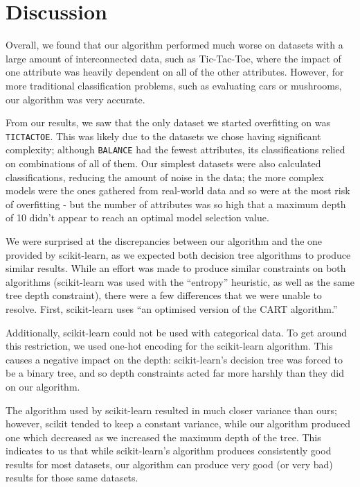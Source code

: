 \documentclass[screen, authorversion, nonacm, sigconf]{acmart}
\begin{document}
\section{Discussion}

Overall, we found that our algorithm performed much worse on datasets with a large amount of interconnected data, such as Tic-Tac-Toe, where the impact of one attribute was heavily dependent on all of the other attributes. However, for more traditional classification problems, such as evaluating cars or mushrooms, our algorithm was very accurate.

From our results, we saw that the only dataset we started overfitting on was \texttt{TICTACTOE}. This was likely due to the datasets we chose having significant complexity; although \texttt{BALANCE} had the fewest attributes, its classifications relied on combinations of all of them. Our simplest datasets were also calculated classifications, reducing the amount of noise in the data; the more complex models were the ones gathered from real-world data and so were at the most risk of overfitting - but the number of attributes was so high that a maximum depth of 10 didn't appear to reach an optimal model selection value.

We were surprised at the discrepancies between our algorithm and the one provided by scikit-learn, as we expected both decision tree algorithms to produce similar results. While an effort was made to produce similar constraints on both algorithms (scikit-learn was used with the ``entropy'' heuristic, as well as the same tree depth constraint), there were a few differences that we were unable to resolve. First, scikit-learn uses ``an optimised version of the CART \cite{DBLP:books/wa/BreimanFOS84} algorithm.''

Additionally, scikit-learn could not be used with categorical data. To get around this restriction, we used one-hot encoding for the scikit-learn algorithm. This causes a negative impact on the depth: scikit-learn's decision tree was forced to be a binary tree, and so depth constraints acted far more harshly than they did on our algorithm.

The algorithm used by scikit-learn resulted in much closer variance than ours; however, scikit tended to keep a constant variance, while our algorithm produced one which decreased as we increased the maximum depth of the tree. This indicates to us that while scikit-learn's algorithm produces consistently good results for most datasets, our algorithm can produce very good (or very bad) results for those same datasets.
\end{document}

